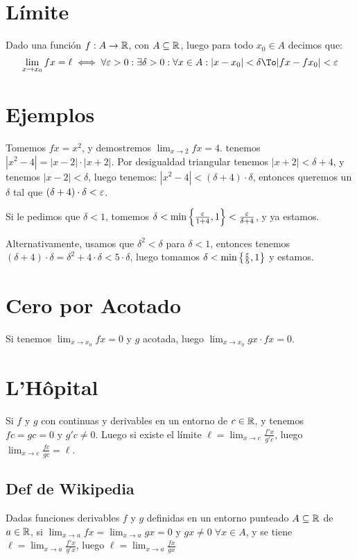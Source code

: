 \documentclass{article}
\begin{document}
\section{Límite}
Dado una función $f : A \to \mathbb{R}$, con $A \subseteq \mathbb{R}$, luego para todo
$x_0 \in A$ decimos que:
\[\lim_{x \to x_0} fx = \ell \iff \forall \e>0 : \exists \delta > 0 :
\forall x \in A : |x - x_0| < \delta \To |fx - fx_0| < \e\]

\section{Ejemplos}
Tomemos $fx = x^2$, y demostremos $\lim_{x \to 2} fx = 4$.
tenemos $|x^2-4| = |x-2| \cdot |x+2|$. Por desigualdad triangular tenemos
$|x+2| < \delta + 4$, y tenemos $|x-2| < \delta$, luego tenemos:
$|x^2-4| < (\delta + 4) \cdot \delta$, entonces queremos un $\delta$ tal que
$(\delta + 4) \cdot \delta < \varepsilon$.

Si le pedimos que $\delta < 1$, tomemos $\delta < \min \left\{\frac{\varepsilon}{1 + 4}, 1 \right\}< \frac{\varepsilon}{\delta + 4}$, y ya estamos.

Alternativamente, usamos que $\delta^2 < \delta$ para $\delta < 1$, entonces tenemos
$(\delta + 4) \cdot \delta = \delta^2 + 4 \cdot \delta < 5 \cdot \delta$, luego
tomamos $\delta < \min \left\{\frac{\varepsilon}{5}, 1\right\}$ y estamos.

\section{Cero por Acotado}
Si tenemos $\lim_{x \to x_0} fx = 0$ y $g$ acotada, luego
$\lim_{x \to x_0} gx \cdot fx = 0$.

\section{L'Hôpital}
Si $f$ y $g$ con continuas y derivables en un entorno de $c \in \mathbb{R}$, y tenemos
$f c = g c = 0$ y $g' c \neq 0$. Luego si existe el límite
$\ell = \lim_{x \to c} \frac{f' x}{g' c}$, luego $\lim_{x \to c} \frac{f c}{g c} = \ell$.

\subsection{Def de Wikipedia}
Dadas funciones derivables $f$ y $g$ definidas en un entorno punteado $A \subseteq \mathbb{R}$
de $a \in \mathbb{R}$, si
$\lim_{x \to a} fx = \lim_{x \to a} gx = 0$ y $g x \neq 0 \; \forall x \in A$, y se tiene
$\ell = \lim_{x \to a} \frac{f' x }{g' x } $,
luego $\ell = \lim_{x \to a} \frac{fx }{gx } $
\end{document}
